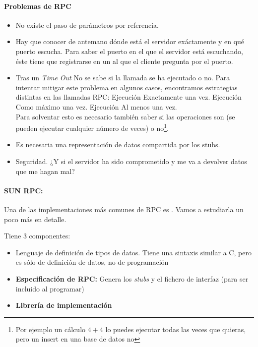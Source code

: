 \documentclass{apuntes}[nochap]
\newcounter{problem}
\begin{document}
\paragraph{Problemas de RPC}
\begin{itemize}
	\item No existe el paso de parámetros por referencia.
	\item Hay que conocer de antemano dónde está el servidor exáctamente y en qué puerto escucha.
	\subitem Para saber el puerto en el que el servidor está escuchando, éste tiene que registrarse en un  al que el cliente pregunta por el puerto.
 	\item Tras un \textit{Time Out} No se sabe si la llamada se ha ejecutado o no. Para intentar mitigar este problema en algunos casos, encontramos estrategias distintas en las llamadas RPC:
		\subitem Ejecución Exactamente una vez.
		\subitem Ejecución Como máximo una vez.
		\subitem Ejecución Al menos una vez.\\
	Para solventar esto es necesario también saber si las operaciones son  (se pueden ejecutar cualquier número de veces) o no\footnote{Por ejemplo un cálculo $4+4$ lo puedes ejecutar todas las veces que quieras, pero un insert en una base de datos no}.
	\item Es necesaria una representación de datos compartida por los stubs.
	\item Seguridad. ¿Y si el servidor ha sido comprometido y me va a devolver datos que me hagan mal?
\end{itemize}


\paragraph{SUN RPC: } Una de las implementaciones más comunes de RPC es . Vamos a estudiarla un poco más en detalle.


Tiene 3 componentes:
\begin{itemize}
	\item {} Lenguaje de definición de tipos de datos. Tiene una sintaxis similar a C, pero es sólo de definición de datos, no de programación
	\item \textbf{Especificación de RPC: } Genera los \textit{stubs} y el fichero de interfaz (para ser incluido al programar)
	\item \textbf{Librería de implementación}
\end{itemize}
\end{document}
